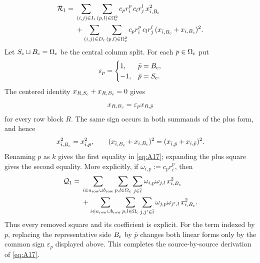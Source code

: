 \documentclass[11pt]{article}
\begin{document}
\[
\begin{aligned}
\mathcal R_1
={}&
\sum_{(i,j)\in I_{\rm r}}
\sum_{(p,l)\in\Omega_{\rm c}^2}
c_pr_i^p\,c_lr_j^l\,x_{\bar i,B_{\rm c}}^2\\
&+
\sum_{(i,j)\in D_{\rm r}}
\sum_{(p,l)\in\Omega_{\rm c}^2}
c_pr_i^p\,c_lr_j^l\,
(x_{\bar i,B_{\rm c}}+x_{i,B_{\rm c}})^2.
\end{aligned}
\]
Let $S_{\rm c}\sqcup B_{\rm c}=\Omega_{\rm c}$ be the central column split.
For
each $p\in\Omega_{\rm c}$ put
\[
\varepsilon_p=
\begin{cases}
 1,&\bar p=B_{\rm c},\\
-1,&\bar p=S_{\rm c}.
\end{cases}
\]
The centered identity $x_{R,S_{\rm c}}+x_{R,B_{\rm c}}=0$ gives
\[
x_{R,B_{\rm c}}=\varepsilon_p x_{R,\bar p}
\]
for every row block $R$.  The same sign occurs in both summands of the plus
form, and hence
\[
x_{\bar i,B_{\rm c}}^2=x_{\bar i,\bar p}^2,\qquad
(x_{\bar i,B_{\rm c}}+x_{i,B_{\rm c}})^2
=(x_{\bar i,\bar p}+x_{i,\bar p})^2.
\]
Renaming $p$ as $k$ gives the first equality in \eqref{eq:A17}; expanding
the plus square gives the second equality.
More explicitly, if $\omega_{i,p}:=c_pr_i^p$, then
\begin{align*}
\mathcal Q_1
={}&\sum_{i\in a_{\rm row}\cup b_{\rm row}}
\sum_{p,l\in\Omega_{\rm c}}
\sum_{j\in\bar i}
\omega_{i,p}\omega_{j,l}\,x_{i,B_{\rm c}}^2\\
&+\sum_{i\in a_{\rm row}\cup b_{\rm row}}
\sum_{p,l\in\Omega_{\rm c}}
\sum_{j,j'\in\bar i}
\omega_{j,p}\omega_{j',l}\,x_{i,B_{\rm c}}^2.
\end{align*}
Thus every removed square and its coefficient is explicit.  For the term
indexed by $p$, replacing the representative side $B_{\rm c}$ by $\bar p$ changes
both linear forms only by the common sign $\varepsilon_p$ displayed above.
This completes the source-by-source derivation of \eqref{eq:A17}.
\end{document}
